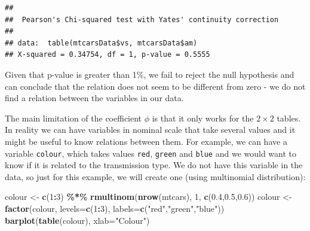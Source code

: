 \documentclass[
]{book}
\newenvironment{Shaded}{\begin{snugshade}}{\end{snugshade}}
\newcommand{\DataTypeTok}[1]{\textcolor[rgb]{0.13,0.29,0.53}{#1}}
\newcommand{\DecValTok}[1]{\textcolor[rgb]{0.00,0.00,0.81}{#1}}
\newcommand{\FloatTok}[1]{\textcolor[rgb]{0.00,0.00,0.81}{#1}}
\newcommand{\KeywordTok}[1]{\textcolor[rgb]{0.13,0.29,0.53}{\textbf{#1}}}
\newcommand{\NormalTok}[1]{#1}
\newcommand{\OperatorTok}[1]{\textcolor[rgb]{0.81,0.36,0.00}{\textbf{#1}}}
\newcommand{\StringTok}[1]{\textcolor[rgb]{0.31,0.60,0.02}{#1}}
\theoremstyle{definition}
\theoremstyle{definition}
\theoremstyle{definition}
\theoremstyle{definition}
\theoremstyle{remark}
\begin{document}
\begin{Shaded}
\end{Shaded}

\begin{verbatim}
## 
##  Pearson's Chi-squared test with Yates' continuity correction
## 
## data:  table(mtcarsData$vs, mtcarsData$am)
## X-squared = 0.34754, df = 1, p-value = 0.5555
\end{verbatim}

Given that p-value is greater than 1\%, we fail to reject the null hypothesis and can conclude that the relation does not seem to be different from zero - we do not find a relation between the variables in our data.

The main limitation of the coefficient \(\phi\) is that it only works for the \(2\times 2\) tables. In reality we can have variables in nominal scale that take several values and it might be useful to know relations between them. For example, we can have a variable \texttt{colour}, which takes values \texttt{red}, \texttt{green} and \texttt{blue} and we would want to know if it is related to the transmission type. We do not have this variable in the data, so just for this example, we will create one (using multinomial distribution):

\begin{Shaded}
\begin{Highlighting}[]
\NormalTok{colour \textless{}{-}}\StringTok{ }\KeywordTok{c}\NormalTok{(}\DecValTok{1}\OperatorTok{:}\DecValTok{3}\NormalTok{) }\OperatorTok{\%*\%}\StringTok{ }\KeywordTok{rmultinom}\NormalTok{(}\KeywordTok{nrow}\NormalTok{(mtcars), }\DecValTok{1}\NormalTok{,}
                               \KeywordTok{c}\NormalTok{(}\FloatTok{0.4}\NormalTok{,}\FloatTok{0.5}\NormalTok{,}\FloatTok{0.6}\NormalTok{))}
\NormalTok{colour \textless{}{-}}\StringTok{ }\KeywordTok{factor}\NormalTok{(colour, }\DataTypeTok{levels=}\KeywordTok{c}\NormalTok{(}\DecValTok{1}\OperatorTok{:}\DecValTok{3}\NormalTok{),}
                 \DataTypeTok{labels=}\KeywordTok{c}\NormalTok{(}\StringTok{"red"}\NormalTok{,}\StringTok{"green"}\NormalTok{,}\StringTok{"blue"}\NormalTok{))}
\KeywordTok{barplot}\NormalTok{(}\KeywordTok{table}\NormalTok{(colour), }\DataTypeTok{xlab=}\StringTok{"Colour"}\NormalTok{)}
\end{Highlighting}
\end{Shaded}
\end{document}
